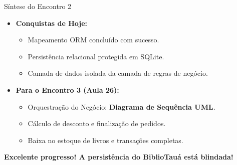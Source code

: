 \documentclass[10pt]{beamer}
\begin{document}
\begin{frame}{Síntese do Encontro 2}
    \begin{itemize}
        \item \textbf{Conquistas de Hoje:}
        \begin{itemize}
            \item Mapeamento ORM concluído com sucesso.
            \item Persistência relacional protegida em SQLite.
            \item Camada de dados isolada da camada de regras de negócio.
        \end{itemize}
        \item \textbf{Para o Encontro 3 (Aula 26):}
        \begin{itemize}
            \item Orquestração do Negócio: \textbf{Diagrama de Sequência UML}.
            \item Cálculo de desconto e finalização de pedidos.
            \item Baixa no estoque de livros e transações completas.
        \end{itemize}
    \end{itemize}
    \vspace{0.4cm}
    \centering
    \textbf{Excelente progresso! A persistência do BiblioTauá está blindada!}
\end{frame}
\end{document}
